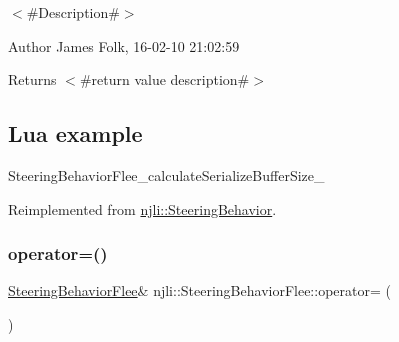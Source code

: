 $<$\#\+Description\#$>$ 

\begin{DoxyAuthor}{Author}
James Folk, 16-\/02-\/10 21\+:02\+:59
\end{DoxyAuthor}
\begin{DoxyReturn}{Returns}
$<$\#return value description\#$>$
\end{DoxyReturn}
\hypertarget{classnjli_1_1_steering_behavior_wander_ex1}{}\subsection{Lua example}\label{classnjli_1_1_steering_behavior_wander_ex1}

\begin{DoxyCodeInclude}
\end{DoxyCodeInclude}
Steering\+Behavior\+Flee\+\_\+calculate\+Serialize\+Buffer\+Size\+\_\+ 

Reimplemented from \mbox{\hyperlink{classnjli_1_1_steering_behavior_acd7af46e42a8a3fc1208a47f50836ac8}{njli\+::\+Steering\+Behavior}}.

\mbox{\label{classnjli_1_1_steering_behavior_flee_ace2e73d385a86278017967e7ab92762b}} 
\subsubsection{\texorpdfstring{operator=()}{operator=()}}
{\footnotesize\ttfamily \mbox{\hyperlink{classnjli_1_1_steering_behavior_flee}{Steering\+Behavior\+Flee}}\& njli\+::\+Steering\+Behavior\+Flee\+::operator= (\begin{DoxyParamCaption}\item[{const \mbox{\hyperlink{classnjli_1_1_steering_behavior_flee}{Steering\+Behavior\+Flee}} \&}]{ }\end{DoxyParamCaption})\hspace{0.3cm}{\ttfamily [protected]}}

\mbox{\label{classnjli_1_1_steering_behavior_flee_a9b960243fb690e3e7273c05bae18b55c}} 
